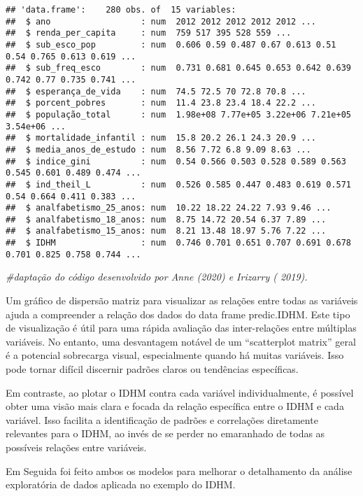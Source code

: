 \documentclass[
]{article}
\newenvironment{Shaded}{\begin{snugshade}}{\end{snugshade}}
\newcommand{\CommentTok}[1]{\textcolor[rgb]{0.56,0.35,0.01}{\textit{#1}}}
\begin{document}
\begin{verbatim}
## 'data.frame':    280 obs. of  15 variables:
##  $ ano                  : num  2012 2012 2012 2012 2012 ...
##  $ renda_per_capita     : num  759 517 395 528 559 ...
##  $ sub_esco_pop         : num  0.606 0.59 0.487 0.67 0.613 0.51 0.54 0.765 0.613 0.619 ...
##  $ sub_freq_esco        : num  0.731 0.681 0.645 0.653 0.642 0.639 0.742 0.77 0.735 0.741 ...
##  $ esperança_de_vida    : num  74.5 72.5 70 72.8 70.8 ...
##  $ porcent_pobres       : num  11.4 23.8 23.4 18.4 22.2 ...
##  $ população_total      : num  1.98e+08 7.77e+05 3.22e+06 7.21e+05 3.54e+06 ...
##  $ mortalidade_infantil : num  15.8 20.2 26.1 24.3 20.9 ...
##  $ media_anos_de_estudo : num  8.56 7.72 6.8 9.09 8.63 ...
##  $ indice_gini          : num  0.54 0.566 0.503 0.528 0.589 0.563 0.545 0.601 0.489 0.474 ...
##  $ ind_theil_L          : num  0.526 0.585 0.447 0.483 0.619 0.571 0.54 0.664 0.411 0.383 ...
##  $ analfabetismo_25_anos: num  10.22 18.22 24.22 7.93 9.46 ...
##  $ analfabetismo_18_anos: num  8.75 14.72 20.54 6.37 7.89 ...
##  $ analfabetismo_15_anos: num  8.21 13.48 18.97 5.76 7.22 ...
##  $ IDHM                 : num  0.746 0.701 0.651 0.707 0.691 0.678 0.701 0.825 0.758 0.744 ...
\end{verbatim}

\begin{Shaded}
\begin{Highlighting}[]
\CommentTok{\#daptação do código desenvolvido por Anne (2020) e Irizarry ( 2019).}
\end{Highlighting}
\end{Shaded}

Um gráfico de dispersão matriz para visualizar as relações entre todas
as variáveis ajuda a compreender a relação dos dados do data frame
predic.IDHM. Este tipo de visualização é útil para uma rápida avaliação
das inter-relações entre múltiplas variáveis. No entanto, uma
desvantagem notável de um ``scatterplot matrix'' geral é a potencial
sobrecarga visual, especialmente quando há muitas variáveis. Isso pode
tornar difícil discernir padrões claros ou tendências específicas.

Em contraste, ao plotar o IDHM contra cada variável individualmente, é
possível obter uma visão mais clara e focada da relação específica entre
o IDHM e cada variável. Isso facilita a identificação de padrões e
correlações diretamente relevantes para o IDHM, ao invés de se perder no
emaranhado de todas as possíveis relações entre variáveis.

Em Seguida foi feito ambos os modelos para melhorar o detalhamento da
análise exploratória de dados aplicada no exemplo do IDHM.
\end{document}
